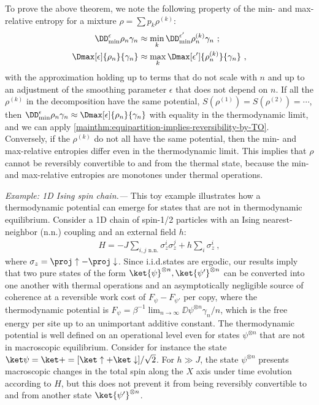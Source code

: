 \documentclass[prl,reprint,longbibliography,superscriptaddress]{revtex4-1}
\renewcommand{\Dminz}[1][]{\DD_{\mathrm{min}}^{#1}}
\newcommand{\DKL}{\DD}
\newcounter{thm}
\renewcommand\paragraph[1]{%
  \par\emph{#1.---}\kern2pt\relax\ignorespaces}
\begin{document}
To prove the above theorem, we note the following property of the min- and
max-relative entropy for a mixture $\rho=\sum p_k \rho^{(k)}$:
\begin{subequations}
  \begin{align}
    \Dminz[\epsilon]{\rho_n}{\gamma_n}
    &\approx \min_k \Dminz[\epsilon']{\rho_n^{(k)}}{\gamma_n}\ ;
    \\
    \Dmax[\epsilon]{\rho_n}{\gamma_n}
    &\approx \max_k \Dmax[\epsilon']{\rho_n^{(k)}}{\gamma_n}\ ,
  \end{align}
\end{subequations}
with the approximation holding up to terms that do not scale with $n$ and up to
an adjustment of the smoothing parameter $\epsilon$ that does not depend on $n$.
If all the $\rho^{(k)}$ in the decomposition have the same potential,
$S(\rho^{(1)}) = S(\rho^{(2)}) = \cdots$, then
$\Dminz[\epsilon]{\rho_n}{\gamma_n} \approx \Dmax[\epsilon]{\rho_n}{\gamma_n}$
with equality in the thermodynamic limit, and we can apply
\cref{mainthm:equipartition-implies-reversibility-by-TO}.  Conversely, if the
$\rho^{(k)}$ do not all have the same potential, then the min- and max-relative
entropies differ even in the thermodynamic limit.  This implies that $\rho$
cannot be reversibly convertible to and from the thermal state, because the min-
and max-relative entropies are monotones under thermal operations.




\paragraph{Example: 1D Ising spin chain}%
This toy example illustrates how a thermodynamic potential can emerge for states
that are not in thermodynamic equilibrium.
%
Consider a 1D chain of spin-1/2 particles with an Ising nearest-neighbor
(n.n.\@) coupling and an external field $h$:
\begin{align}
  H = -J\! \sum_{i, j\text{ n.n.}}\! \sigma_z^{i}\sigma_z^{j} + h\sum_i \sigma_z^{i}\ ,
\end{align}
where $\sigma_z = \proj\uparrow - \proj\downarrow$.  Since i.i.d.\@ states are
ergodic, our results imply that two pure states of the form
$\ket{\psi}^{\otimes n}, \ket{\psi'}^{\otimes n}$ can be converted into one
another with thermal operations and an asymptotically negligible source of
coherence at a reversible work cost of $F_\psi - F_{\psi'}$ per copy, where the
thermodynamic potential is $F_\psi = \beta^{-1} \lim_{n\to\infty} %
\DKL{\psi^{\otimes n}}{\gamma_n}/n$, which is the free energy per site up to an
unimportant additive constant.  The thermodynamic potential is well defined on
an operational level even for states $\psi^{\otimes n}$ that are not in
macroscopic equilibrium.  Consider for instance the state
$\ket\psi=\ket+=[\ket\uparrow+\ket\downarrow]/\sqrt{2}$.  For $h\gg J$, the
state $\psi^{\otimes n}$ presents macroscopic changes in the total spin along
the $X$ axis under time evolution according to $H$, but this does not prevent it
from being reversibly convertible to and from another state
$\ket{\psi'}^{\otimes n}$.
\end{document}
